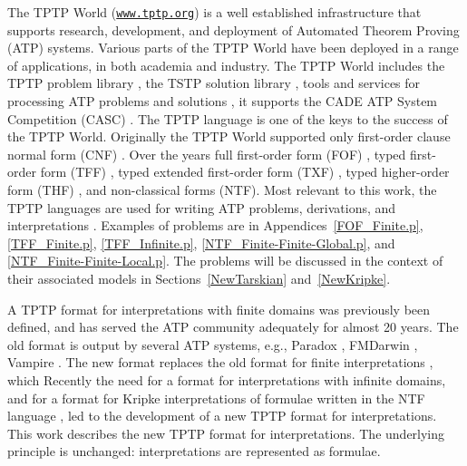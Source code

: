 \documentclass{easychair}
\begin{document}
The TPTP World \cite{Sut17} (\href{https://www.tptp.org}{\tt www.tptp.org}) is a well established 
infrastructure that supports research, development, and deployment of Automated Theorem Proving 
(ATP) systems.
Various parts of the TPTP World have been deployed in a range of applications,
in both academia and industry.
The TPTP World includes the TPTP problem library \cite{Sut09}, 
the TSTP solution library \cite{Sut10}, 
tools and services for processing ATP problems and solutions \cite{Sut10}, 
it supports the CADE ATP System Competition (CASC) \cite{Sut16}.
The TPTP language \cite{Sut23-IGPL} is one of the keys to the success of the TPTP World.
Originally the TPTP World supported only first-order clause normal form (CNF)
\cite{SS98-JAR}.
Over the years full first-order form (FOF)
\cite{Sut09}, 
typed first-order form (TFF)
\cite{SS+12,BP13-TFF1}, 
typed extended first-order form (TXF)
\cite{SK18}, 
typed higher-order form (THF)
\cite{SB10,KSR16}, 
and non-classical forms (NTF).
Most relevant to this work, the TPTP languages are used for writing ATP problems, 
derivations, and interpretations \cite{SS+06,Sut08-KEAPPA}.
Examples of problems are in Appendices~\ref{FOF_Finite.p}, \ref{TFF_Finite.p},
\ref{TFF_Infinite.p}, \ref{NTF_Finite-Finite-Global.p}, and \ref{NTF_Finite-Finite-Local.p}.
The problems will be discussed in the context of their associated models in 
Sections~\ref{NewTarskian} and~\ref{NewKripke}.

A TPTP format for interpretations with finite domains \cite{SS+06} was previously been defined, 
and has served the ATP community adequately for almost 20 years. 
The old format is output by several ATP systems, e.g., Paradox \cite{CS03}, FMDarwin \cite{BF+06}, 
Vampire \cite{KV13}.
The new format replaces the old format for finite interpretations \cite{SS+06}, which 
Recently the need for a format for interpretations with infinite domains, and for a format for 
Kripke interpretations \cite{Kri63} of formulae written in the NTF language \cite{SF+22}, 
led to the development of a new TPTP format for interpretations.
This work describes the new TPTP format for interpretations.
The underlying principle is unchanged: interpretations are represented as formulae.
\end{document}
